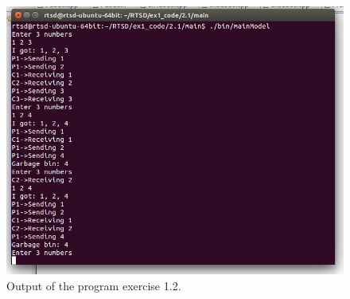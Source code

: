 \documentclass[a4paper,twoside,11pt]{article}
\begin{document}
\begin{figure}
	\centering
	\includegraphics[width=\textwidth]{./images/2-1_output.png}
	\caption{Output of the program exercise 1.2.}
	\label{fig:2_1-output}
\end{figure}

\FloatBarrier
\subsection{}
\end{document}
